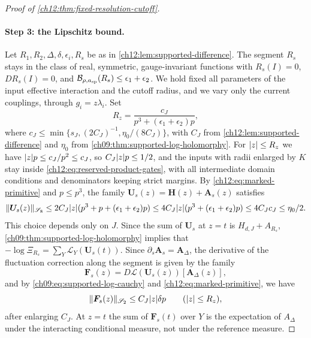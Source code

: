 \begin{proof}[Proof of \cref{ch12:thm:fixed-resolution-cutoff}]
\paragraph{Step 3: the Lipschitz bound.}
Let $R_1,R_2,\Delta,\delta,\epsilon_i,R_s$ be as in \cref{ch12:lem:supported-difference}. The segment $R_s$ stays in the class of real, symmetric, gauge-invariant functions with $R_s(I)=0$, $DR_s(I)=0$, and $\mathcal B_{\rho,a_{\mathrm{sp}}}(R_s)\le\epsilon_1+\epsilon_2$. We hold fixed all parameters of the input effective interaction and the cutoff radius, and we vary only the current couplings, through $g_i=z\lambda_i$. Set
\begin{equation}\label{ch12:eq:aux-disc}
 R_z=\frac{c_J}{p^3+(\epsilon_1+\epsilon_2)p},
\end{equation}
where $c_J\le\min\{s_J,(2C_J)^{-1},\eta_0/(8C_J)\}$, with $C_J$ from \cref{ch12:lem:supported-difference} and $\eta_0$ from \cref{ch09:thm:supported-log-holomorphy}. For $\lvert z\rvert\le R_z$ we have $\lvert z\rvert p\le c_J/p^2\le c_J$, so $C_J\lvert z\rvert p\le1/2$, and the inputs with radii enlarged by $K$ stay inside \eqref{ch12:eq:reserved-product-gates}, with all intermediate domain conditions and denominators keeping strict margins. By \eqref{ch12:eq:marked-primitive} and $p\le p^3$, the family $\boldsymbol U_s(z)=\boldsymbol H(z)+\boldsymbol A_s(z)$ satisfies
\[
 \lVert \boldsymbol U_s(z)\rVert_{\mathscr S_8}\le2C_J\lvert z\rvert(p^3+p+(\epsilon_1+\epsilon_2)p)\le4C_J\lvert z\rvert(p^3+(\epsilon_1+\epsilon_2)p)\le4C_Jc_J\le\eta_0/2 .
\]
This choice depends only on $J$. Since the sum of $\boldsymbol U_s$ at $z=t$ is $H_{d,J}+A_{R_s}$, \cref{ch09:thm:supported-log-holomorphy} implies that $-\log\Xi_{R_s}=\sum_Y\mathcal L_Y(\boldsymbol U_s(t))$. Since $\partial_s\boldsymbol A_s=\boldsymbol A_\Delta$, the derivative of the fluctuation correction along the segment is given by the family
\[
 \boldsymbol F_s(z)=D\boldsymbol{\mathcal L}(\boldsymbol U_s(z))[\boldsymbol A_\Delta(z)],
\]
and by \eqref{ch09:eq:supported-log-cauchy} and \eqref{ch12:eq:marked-primitive}, we have
\begin{equation}\label{ch12:eq:marked-log}
 \lVert \boldsymbol F_s(z)\rVert_{\mathscr S_2}\le C_J\lvert z\rvert\delta p\qquad(\lvert z\rvert\le R_z),
\end{equation}
after enlarging $C_J$. At $z=t$ the sum of $\boldsymbol F_s(t)$ over $Y$ is the expectation of $A_\Delta$ under the interacting conditional measure, not under the reference measure.


\end{proof}
